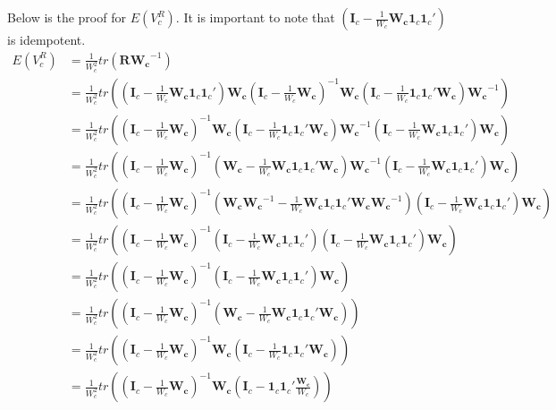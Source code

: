 Below is the proof for $E(V^R_c)$. It is important to note that  $\left(\mathbf{I}_c - \frac{1}{W_c} \mathbf{W_c} \mathbf{1}_c\mathbf{1}_c' \right)$ is idempotent. 
\begin{equation}
    \begin{split}
       E(V^R_c) & = \frac{1}{W^2_c } tr(\mathbf{R}\mathbf{W_c}^{-1}) \\
       & = \frac{1}{W^2_c} tr\left( \left(\mathbf{I}_c - \frac{1}{W_c} \mathbf{W_c} \mathbf{1}_c\mathbf{1}_c' \right) \mathbf{W_c} \left(\mathbf{I}_c - \frac{1}{W_c} \mathbf{W_c} \right)^{-1} \mathbf{W_c} \left(\mathbf{I}_c - \frac{1}{W_c}  \mathbf{1}_c\mathbf{1}_c' \mathbf{W_c}\right) \mathbf{W_c}^{-1}  \right) \\
        & = \frac{1}{W^2_c} tr\left( \left(\mathbf{I}_c - \frac{1}{W_c} \mathbf{W_c} \right)^{-1} \mathbf{W_c}   \left(\mathbf{I}_c - \frac{1}{W_c}  \mathbf{1}_c\mathbf{1}_c' \mathbf{W_c}\right) \mathbf{W_c}^{-1}  \left(\mathbf{I}_c - \frac{1}{W_c} \mathbf{W_c} \mathbf{1}_c\mathbf{1}_c' \right)  \mathbf{W_c} \right) \\
        & = \frac{1}{W^2_c} tr\left( \left(\mathbf{I}_c - \frac{1}{W_c} \mathbf{W_c} \right)^{-1}    \left(\mathbf{W_c} - \frac{1}{W_c} \mathbf{W_c}  \mathbf{1}_c\mathbf{1}_c' \mathbf{W_c}\right) \mathbf{W_c}^{-1}  \left(\mathbf{I}_c - \frac{1}{W_c} \mathbf{W_c} \mathbf{1}_c\mathbf{1}_c' \right)  \mathbf{W_c} \right) \\
        & = \frac{1}{W_c^2} tr\left( \left(\mathbf{I}_c - \frac{1}{W_c} \mathbf{W_c} \right)^{-1}    \left(\mathbf{W_c}\mathbf{W_c}^{-1} - \frac{1}{W_c} \mathbf{W_c}  \mathbf{1}_c\mathbf{1}_c' \mathbf{W_c} \mathbf{W_c}^{-1}\right)   \left(\mathbf{I}_c - \frac{1}{W_c} \mathbf{W_c} \mathbf{1}_c\mathbf{1}_c' \right)  \mathbf{W_c} \right) \\
        & = \frac{1}{W^2_c} tr\left( \left(\mathbf{I}_c - \frac{1}{W_c} \mathbf{W_c} \right)^{-1}    \left(\mathbf{I}_c - \frac{1}{W_c} \mathbf{W_c}  \mathbf{1}_c\mathbf{1}_c'\right)   \left(\mathbf{I}_c - \frac{1}{W_c} \mathbf{W_c} \mathbf{1}_c\mathbf{1}_c' \right)  \mathbf{W_c} \right) \\
        & = \frac{1}{W_c^2} tr\left( \left(\mathbf{I}_c - \frac{1}{W_c} \mathbf{W_c} \right)^{-1}    \left(\mathbf{I}_c - \frac{1}{W_c} \mathbf{W_c}  \mathbf{1}_c\mathbf{1}_c'\right)    \mathbf{W_c} \right) \\
        & = \frac{1}{W^2_c} tr\left( \left(\mathbf{I}_c - \frac{1}{W_c} \mathbf{W_c} \right)^{-1}    \left(\mathbf{W_c} - \frac{1}{W_c} \mathbf{W_c}  \mathbf{1}_c\mathbf{1}_c'\mathbf{W_c}\right)     \right) \\
        & = \frac{1}{W^2_c} tr\left( \left(\mathbf{I}_c - \frac{1}{W_c} \mathbf{W_c} \right)^{-1}   \mathbf{W_c} \left(\mathbf{I}_c - \frac{1}{W_c}   \mathbf{1}_c\mathbf{1}_c'\mathbf{W_c}\right)     \right) \\
         & = \frac{1}{W^2_c} tr\left( \left(\mathbf{I}_c - \frac{1}{W_c} \mathbf{W_c} \right)^{-1}   \mathbf{W_c} \left(\mathbf{I}_c -    \mathbf{1}_c\mathbf{1}_c'\frac{\mathbf{W_c}}{W_c}\right)     \right) \\
    \end{split}
    \nonumber
\end{equation}
